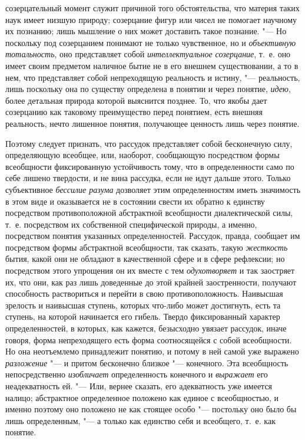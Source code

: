 созерцательный момент служит причиной того обстоятельства, что материя
таких наук имеет низшую природу; созерцание фигур или чисел не помогает
научному их познанию; лишь мышление о них может доставить такое познание.
"--- Но поскольку под созерцанием понимают не только
чувственное, но и {\em объективную
тотальность}, оно представляет собой
{\em интеллектуальное созерцание},
т.~е. оно имеет своим предметом наличное бытие не в его
внешнем существовании, а то в нем, что представляет собой непреходящую
реальность и истину, "--- реальность, лишь поскольку она по
существу определена в понятии и через понятие,
{\em идею}, более
детальная природа которой выяснится позднее. То, что якобы дает созерцанию
как таковому преимущество перед понятием, есть внешняя реальность, нечто
лишенное понятия, получающее ценность лишь через понятие.

Поэтому следует признать, что рассудок представляет собой
бесконечную силу, определяющую всеобщее, или, наоборот, сообщающую
посредством формы всеобщности фиксированную устойчивость тому, что в
определенности само по себе лишено твердости, и не вина
рассудка, если не идут дальше этого. Только субъективное
{\em бессилие разума}
дозволяет этим определенностям иметь значимость в этом виде и
оказывается не в состоянии свести их обратно к единству посредством
противоположной абстрактной всеобщности диалектической силы, т.~е.
посредством их собственной специфической природы, а именно, посредством
понятия указанных определенностей. Рассудок, правда, сообщает им
посредством формы абстрактной всеобщности, так сказать, такую
{\em жесткость} бытия,
какой они не обладают в качественной сфере и в сфере рефлексии; но
посредством этого упрощения он их вместе с тем
{\em одухотворяет} и так
заостряет их, что они, как раз лишь доведенные до этой крайней
заостренности, получают способность раствориться и перейти в свою
противоположность. Наивысшая зрелость и наивысшая ступень, которых что-либо
может достигнуть, есть та ступень, на которой начинается его гибель. Твердо
фиксированный характер определенностей, в которых, как кажется, безысходно
увязает рассудок, иначе говоря, форма непреходящего есть форма
соотносящейся с собой всеобщности. Но она неотъемлемо принадлежит понятию,
и потому в ней самой уже выражено
{\em разложение} "--- и
притом бесконечно близкое "--- конечного. Эта всеобщность
непосредственно {\em изобличает}
определенность конечного и
{\em выражает} его
неадекватность ей. "--- Или, вернее сказать, его адекватность
уже имеется налицо; абстрактное определенное положено как единое с
всеобщностью, и именно поэтому оно положено не как стоящее особо
"--- постольку оно было бы лишь определенным, "--- а
только как единство себя и всеобщего, т.~е. как понятие.

